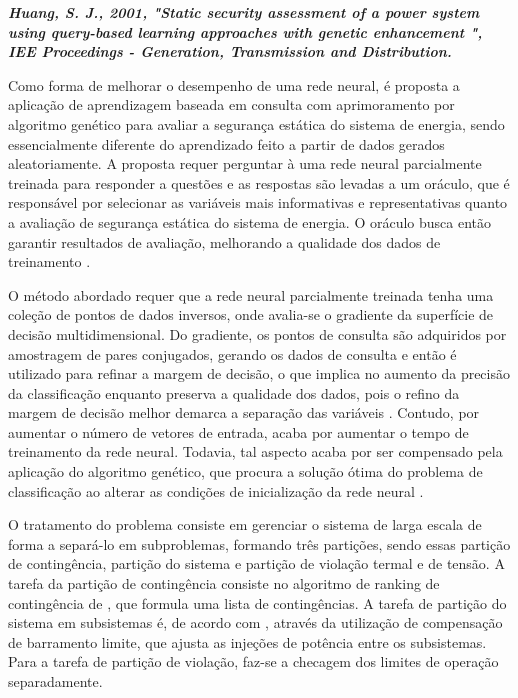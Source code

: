 \documentclass[12pt,oneside,a4paper,chapter=TITLE,section=TITLE,sumario=tradicional,english,brazil]{abntex2}
\begin{document}
\textbf{\textit{Huang, S. J., 2001, "Static security assessment of a power system using query-based learning approaches with genetic enhancement ",  IEE Proceedings - Generation, Transmission and Distribution.}}\par
Como forma de melhorar o desempenho de uma rede neural, é proposta a aplicação de aprendizagem baseada em consulta com aprimoramento por algoritmo genético para avaliar a segurança estática do sistema de energia, sendo essencialmente diferente do aprendizado feito a partir de dados gerados aleatoriamente. A proposta requer perguntar à uma rede neural parcialmente treinada para responder a questões e as respostas são levadas a um oráculo, que é responsável por selecionar as variáveis mais informativas e representativas quanto a avaliação de segurança estática do sistema de energia. O oráculo busca então garantir resultados de avaliação, melhorando a qualidade dos dados de treinamento \cite{chang1997}.\par 
O método abordado requer que a rede neural parcialmente treinada tenha uma coleção de pontos de dados inversos, onde avalia-se o gradiente da superfície de decisão multidimensional. Do gradiente, os pontos de consulta são adquiridos por amostragem de pares conjugados, gerando os dados de consulta e então é utilizado para refinar a margem de decisão, o que implica no aumento da precisão da classificação enquanto preserva a qualidade dos dados, pois o refino da margem de decisão melhor demarca a separação das variáveis \cite{huang1996}. Contudo, por aumentar o número de vetores de entrada, acaba por aumentar o tempo de treinamento da rede neural. Todavia, tal aspecto acaba por ser compensado pela aplicação do algoritmo genético, que procura a solução ótima do problema de classificação ao alterar as condições de inicialização da rede neural \cite{huang1995}.\par
O tratamento do problema consiste em gerenciar o sistema de larga escala de forma a separá-lo em subproblemas, formando três partições, sendo essas partição de contingência, partição do sistema e partição de violação termal e de tensão. A tarefa da partição de contingência consiste no algoritmo de ranking de contingência de \textcite{hsu1992}, que formula uma lista de contingências. A tarefa de partição do sistema em subsistemas é, de acordo com \textcite{debs1988}, através da utilização de compensação de barramento limite, que ajusta as injeções de potência entre os subsistemas. Para a tarefa de partição de violação, faz-se a checagem dos limites de operação separadamente.\par 
\end{document}
